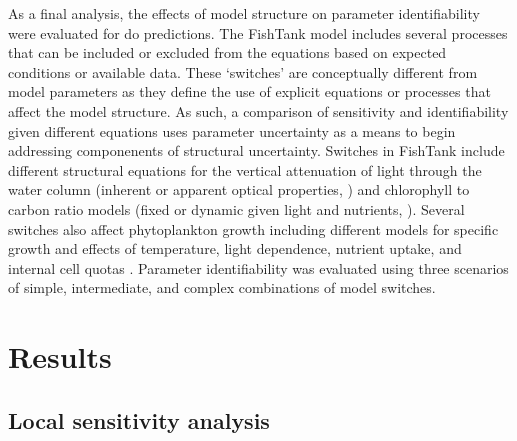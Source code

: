 \documentclass[letterpaper,12pt,oneside]{article}\usepackage[]{graphicx}\usepackage[]{color}
\begin{document}
As a final analysis, the effects of model structure on parameter identifiability were evaluated for \ac{do} predictions.  The FishTank model includes several processes that can be included or excluded from the equations based on expected conditions or available data.  These `switches' are conceptually different from model parameters as they define the use of explicit equations or processes that affect the model structure.  As such, a comparison of sensitivity and identifiability given different equations uses parameter uncertainty as a means to begin addressing componenents of structural uncertainty.  Switches in FishTank include different structural equations for the vertical attenuation of light through the water column (inherent or apparent optical properties, \citealt{Penta09,Eldridge10}) and chlorophyll to carbon ratio models (fixed or dynamic given light and nutrients, \citealt{Cloern95}).  Several switches also affect phytoplankton growth including different models for specific growth and effects of temperature, light dependence, nutrient uptake, and internal cell quotas .  Parameter identifiability was evaluated using three scenarios of simple, intermediate, and complex combinations of model switches.  

\section{Results}



\subsection{Local sensitivity analysis}
\end{document}

